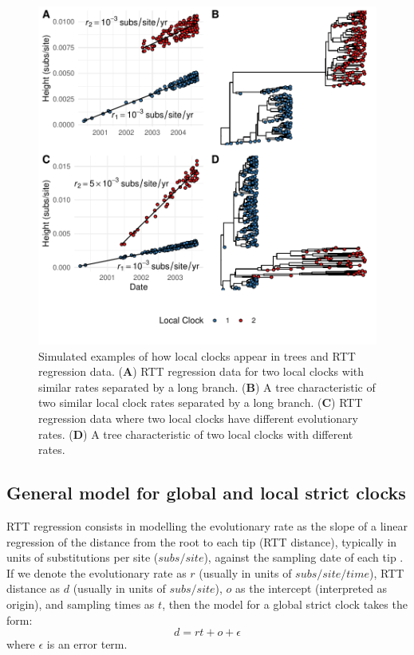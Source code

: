 \documentclass{article}
\begin{document}
\begin{figure}[H]
\centering
\includegraphics[width = 0.75\linewidth]{egRTT}
\caption{Simulated examples of how local clocks appear in trees and RTT regression data. (\textbf{A}) RTT regression data for two local clocks with similar rates separated by a long branch. (\textbf{B})
A tree characteristic of two similar local clock rates separated by a long branch. (\textbf{C}) RTT regression data where two local clocks have different evolutionary rates. (\textbf{D}) A tree characteristic of two local clocks with different rates.}
\label{fig:egRTT}
\end{figure}

\subsection*{General model for global and local strict clocks}
RTT regression consists in modelling the evolutionary rate as the slope of a linear regression of the distance from the root to each tip (RTT distance), typically in units of substitutions per site ($subs/site$), against the sampling date of each tip \citep{drummond_inference_2003}. If we denote the evolutionary rate as $r$ (usually in units of $subs/site/time$), RTT distance as $d$ (usually in units of $subs/site$), $o$ as the intercept (interpreted as origin), and sampling times as $t$, then the model for a global strict clock takes the form:
\begin{equation*}
    d = rt + o + \epsilon
\end{equation*}
where $\epsilon$ is an error term.
\end{document}
